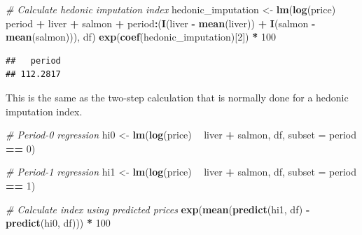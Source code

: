\documentclass[]{article}
\newenvironment{Shaded}{\begin{snugshade}}{\end{snugshade}}
\newcommand{\CommentTok}[1]{\textcolor[rgb]{0.56,0.35,0.01}{\textit{#1}}}
\newcommand{\DataTypeTok}[1]{\textcolor[rgb]{0.13,0.29,0.53}{#1}}
\newcommand{\DecValTok}[1]{\textcolor[rgb]{0.00,0.00,0.81}{#1}}
\newcommand{\KeywordTok}[1]{\textcolor[rgb]{0.13,0.29,0.53}{\textbf{#1}}}
\newcommand{\NormalTok}[1]{#1}
\newcommand{\OperatorTok}[1]{\textcolor[rgb]{0.81,0.36,0.00}{\textbf{#1}}}
\newcommand{\StringTok}[1]{\textcolor[rgb]{0.31,0.60,0.02}{#1}}
\begin{document}
\begin{Shaded}
\begin{Highlighting}[]
\CommentTok{# Calculate hedonic imputation index}
\NormalTok{hedonic_imputation <-}\StringTok{ }\KeywordTok{lm}\NormalTok{(}\KeywordTok{log}\NormalTok{(price) }\OperatorTok{~}\StringTok{ }\NormalTok{period }\OperatorTok{+}\StringTok{ }\NormalTok{liver }\OperatorTok{+}\StringTok{ }\NormalTok{salmon }\OperatorTok{+}\StringTok{ }
\StringTok{                           }\NormalTok{period}\OperatorTok{:}\NormalTok{(}\KeywordTok{I}\NormalTok{(liver }\OperatorTok{-}\StringTok{ }\KeywordTok{mean}\NormalTok{(liver)) }\OperatorTok{+}\StringTok{ }\KeywordTok{I}\NormalTok{(salmon }\OperatorTok{-}\StringTok{ }\KeywordTok{mean}\NormalTok{(salmon))), }
\NormalTok{                         df)}
\KeywordTok{exp}\NormalTok{(}\KeywordTok{coef}\NormalTok{(hedonic_imputation)[}\DecValTok{2}\NormalTok{]) }\OperatorTok{*}\StringTok{ }\DecValTok{100}
\end{Highlighting}
\end{Shaded}

\begin{verbatim}
##   period 
## 112.2817
\end{verbatim}

This is the same as the two-step calculation that is normally done for a hedonic imputation index.

\begin{Shaded}
\begin{Highlighting}[]
\CommentTok{# Period-0 regression}
\NormalTok{hi0 <-}\StringTok{ }\KeywordTok{lm}\NormalTok{(}\KeywordTok{log}\NormalTok{(price) }\OperatorTok{~}\StringTok{ }\NormalTok{liver }\OperatorTok{+}\StringTok{ }\NormalTok{salmon, df, }\DataTypeTok{subset =}\NormalTok{ period }\OperatorTok{==}\StringTok{ }\DecValTok{0}\NormalTok{)}

\CommentTok{# Period-1 regression}
\NormalTok{hi1 <-}\StringTok{ }\KeywordTok{lm}\NormalTok{(}\KeywordTok{log}\NormalTok{(price) }\OperatorTok{~}\StringTok{ }\NormalTok{liver }\OperatorTok{+}\StringTok{ }\NormalTok{salmon, df, }\DataTypeTok{subset =}\NormalTok{ period }\OperatorTok{==}\StringTok{ }\DecValTok{1}\NormalTok{)}

\CommentTok{# Calculate index using predicted prices}
\KeywordTok{exp}\NormalTok{(}\KeywordTok{mean}\NormalTok{(}\KeywordTok{predict}\NormalTok{(hi1, df) }\OperatorTok{-}\StringTok{ }\KeywordTok{predict}\NormalTok{(hi0, df))) }\OperatorTok{*}\StringTok{ }\DecValTok{100}
\end{Highlighting}
\end{Shaded}
\end{document}
